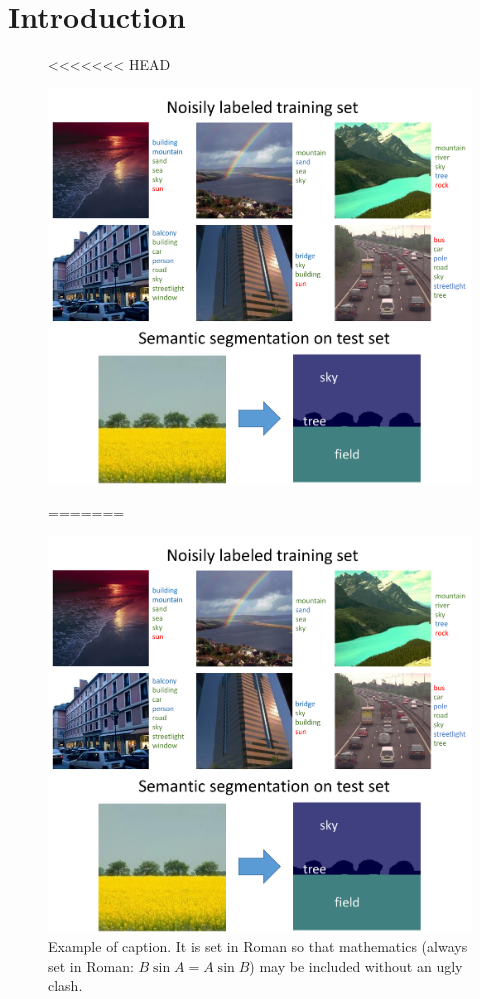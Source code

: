 \section{Introduction}

\begin{figure}[t]
<<<<<<< HEAD
	\begin{center}
   		\includegraphics[width=0.95\linewidth]{noisyparsing.pdf}
	\end{center}
   \caption{Example of caption.  It is set in Roman so that mathematics
   (always set in Roman: $B \sin A = A \sin B$) may be included without an
   ugly clash.}
\label{fig:noisyparsing}
=======
\begin{center}
    \includegraphics[width=1\linewidth]{noisyparsing.pdf}

\end{center}
\end{figure}
